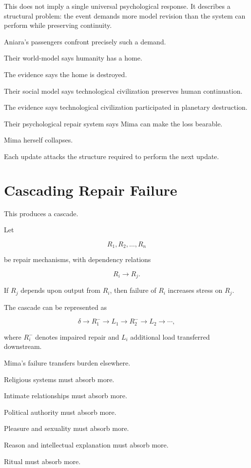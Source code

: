 \documentclass[11pt,oneside]{book}
\theoremstyle{definition}
\theoremstyle{remark}
\begin{document}
This does not imply a single universal psychological response. It describes a structural problem: the event demands more model revision than the system can perform while preserving continuity.

Aniara's passengers confront precisely such a demand.

Their world-model says humanity has a home.

The evidence says the home is destroyed.

Their social model says technological civilization preserves human continuation.

The evidence says technological civilization participated in planetary destruction.

Their psychological repair system says Mima can make the loss bearable.

Mima herself collapses.

Each update attacks the structure required to perform the next update.

\section{Cascading Repair Failure}

This produces a cascade.

Let

\[
R_1,R_2,\ldots,R_n
\]

be repair mechanisms, with dependency relations

\[
R_i\rightarrow R_j.
\]

If \(R_j\) depends upon output from \(R_i\), then failure of \(R_i\) increases stress on \(R_j\).

The cascade can be represented as

\[
\delta
\rightarrow
R_1^{-}
\rightarrow
L_1
\rightarrow
R_2^{-}
\rightarrow
L_2
\rightarrow\cdots,
\]

where \(R_i^{-}\) denotes impaired repair and \(L_i\) additional load transferred downstream.

Mima's failure transfers burden elsewhere.

Religious systems must absorb more.

Intimate relationships must absorb more.

Political authority must absorb more.

Pleasure and sexuality must absorb more.

Reason and intellectual explanation must absorb more.

Ritual must absorb more.
\end{document}

